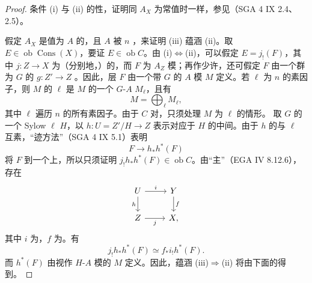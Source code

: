 \begin{proof}
条件 (i) 与 (ii) 的性，证明同 $A_X$ 为常值时一样，参见（SGA 4 IX 2.4、2.5）。

假定 $A_X$ 是值为 $A$ 的，且 $A$ 被 $n$ ，来证明 (iii) 蕴涵 (ii)。取 $E\in\operatorname{ob}\operatorname{Cons}(X)$，要证 $E\in\operatorname{ob}C$。由 (i)$\Longleftrightarrow$(ii)，可以假定 $E=j_!(F)$，其中 $j:Z\to X$ 为（分别地，）的，而 $F$ 为 $A_Z$ 模；再作少许，还可假定 $F$ 由一个群为 $G$ 的 $g:Z'\to Z$ 。因此，层 $F$ 由一个带 $G$ 的 $A$ 模 $M$ 定义。若 $\ell$ 为 $n$ 的素因子，则 $M$ 的 $\ell$ 是 $M$ 的一个 $G$-$A$  $M_\ell$，且有
\[
M=\bigoplus_\ell M_\ell,
\]
其中 $\ell$ 遍历 $n$ 的所有素因子。由于 $C$ 对，只须处理 $M$ 为 $\ell$ 的情形。
取 $G$ 的一个 Sylow $\ell$  $H$，以 $h:U=Z'/H\to Z$ 表示对应于 $H$ 的中间。由于 $h$ 的与 $\ell$ 互素，“迹方法”（SGA 4 IX 5.1）表明
\[
F\longrightarrow h_*h^*(F)
\]
将 $F$ 到一个上，所以只须证明 $j_!h_*h^*(F)\in\operatorname{ob}C$。由“主”（EGA IV 8.12.6），存在
\[
\begin{tikzcd}
U\arrow[r,"i"]\arrow[d,"h"']&Y\arrow[d,"f"]\\
Z\arrow[r,"j"']&X,
\end{tikzcd}
\]
其中 $i$ 为，$f$ 为。有
\[
j_!h_*h^*(F)\simeq f_*i_!h^*(F).
\]
而 $h^*(F)$ 由视作 $H$-$A$ 模的 $M$ 定义。因此，蕴涵 (iii)$\Longrightarrow$(ii) 将由下面的得到。
\end{proof}

